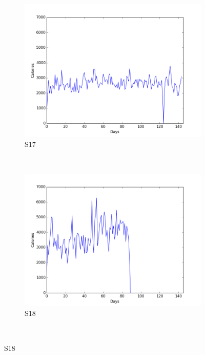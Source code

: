 \documentclass[12pt]{article} %
\begin{document}
\begin{figure}[H]
    \begin{subfigure}[b]{0.2\textwidth}
        \includegraphics[width=\textwidth]{img/graphs/17-calories-1}
        \caption{S17}
        \label{fig:s17cal}
    \end{subfigure}
    ~ %
    \begin{subfigure}[b]{0.2\textwidth}
        \includegraphics[width=\textwidth]{img/graphs/18-calories-1}
        \caption{S18}
        \label{fig:s18cal}
    \end{subfigure}
    ~ %

\end{figure}
\end{document}
